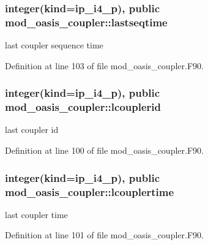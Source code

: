 \hypertarget{classmod__oasis__coupler_a47f4727f94719892d837f6a1545d3d08}{
\subsubsection[{lastseqtime}]{\setlength{\rightskip}{0pt plus 5cm}integer(kind=ip\+\_\+i4\+\_\+p), public mod\+\_\+oasis\+\_\+coupler\+::lastseqtime}}\label{classmod__oasis__coupler_a47f4727f94719892d837f6a1545d3d08}


last coupler sequence time 



Definition at line 103 of file mod\+\_\+oasis\+\_\+coupler.\+F90.

\hypertarget{classmod__oasis__coupler_a2e4d905b50abb50cea9382a8b58e3e0c}{
\subsubsection[{lcouplerid}]{\setlength{\rightskip}{0pt plus 5cm}integer(kind=ip\+\_\+i4\+\_\+p), public mod\+\_\+oasis\+\_\+coupler\+::lcouplerid}}\label{classmod__oasis__coupler_a2e4d905b50abb50cea9382a8b58e3e0c}


last coupler id 



Definition at line 100 of file mod\+\_\+oasis\+\_\+coupler.\+F90.

\hypertarget{classmod__oasis__coupler_a477b53431b7aa1d2b311a78e5db7f00f}{
\subsubsection[{lcouplertime}]{\setlength{\rightskip}{0pt plus 5cm}integer(kind=ip\+\_\+i4\+\_\+p), public mod\+\_\+oasis\+\_\+coupler\+::lcouplertime}}\label{classmod__oasis__coupler_a477b53431b7aa1d2b311a78e5db7f00f}


last coupler time 



Definition at line 101 of file mod\+\_\+oasis\+\_\+coupler.\+F90.

